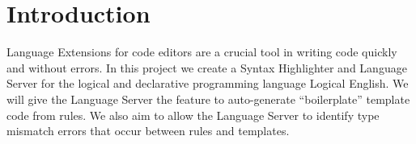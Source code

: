 \documentclass[../main.tex]{subfiles}
\begin{document}
\section*{Introduction}
Language Extensions for code editors are a crucial tool in writing code quickly and without errors. In this project we create a Syntax Highlighter and Language Server for the logical and declarative programming language Logical English. We will give the Language Server the feature to auto-generate ``boilerplate'' template code from rules. We also aim to allow the Language Server to identify type mismatch errors that occur between rules and templates.
\end{document}
